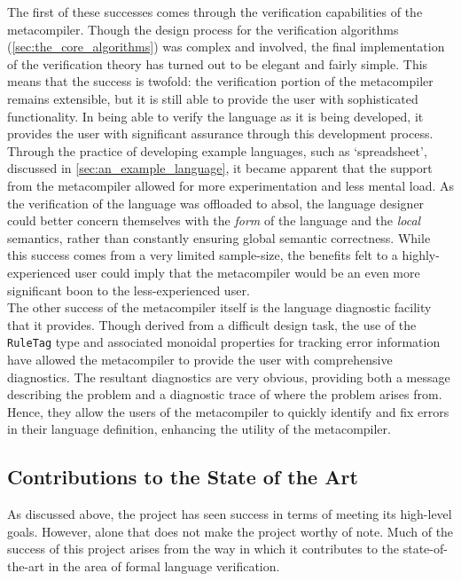 The first of these successes comes through the verification capabilities of the metacompiler. 
Though the design process for the verification algorithms (\autoref{sec:the_core_algorithms}) was complex and involved, the final implementation of the verification theory has turned out to be elegant and fairly simple.
This means that the success is twofold: the verification portion of the metacompiler remains extensible, but it is still able to provide the user with sophisticated functionality.
In being able to verify the language as it is being developed, it provides the user with significant assurance through this development process.
Through the practice of developing example languages, such as `spreadsheet', discussed in \autoref{sec:an_example_language}, it became apparent that the support from the metacompiler allowed for more experimentation and less mental load.
As the verification of the language was offloaded to \gls{absol}, the language designer could better concern themselves with the \textit{form} of the language and the \textit{local} semantics, rather than constantly ensuring global semantic correctness.
While this success comes from a very limited sample-size, the benefits felt to a highly-experienced user could imply that the metacompiler would be an even more significant boon to the less-experienced user. \\

The other success of the metacompiler itself is the language diagnostic facility that it provides.
Though derived from a difficult design task, the use of the \texttt{RuleTag} type and associated monoidal properties for tracking error information have allowed the metacompiler to provide the user with comprehensive diagnostics.
The resultant diagnostics are very obvious, providing both a message describing the problem and a diagnostic trace of where the problem arises from.
Hence, they allow the users of the metacompiler to quickly identify and fix errors in their language definition, enhancing the utility of the metacompiler.


\subsection{Contributions to the State of the Art} %
\label{sub:contributions_to_the_state_of_the_art}
As discussed above, the project has seen success in terms of meeting its high-level goals.
However, alone that does not make the project worthy of note.
Much of the success of this project arises from the way in which it contributes to the state-of-the-art in the area of formal language verification.\\

